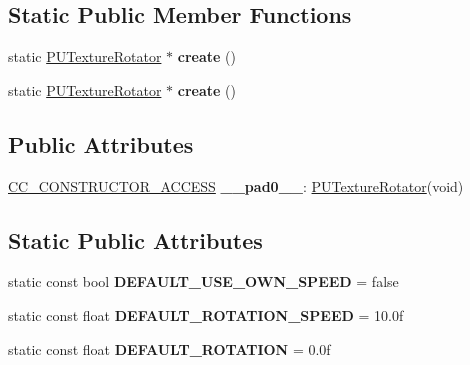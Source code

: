 \subsection*{Static Public Member Functions}
\begin{DoxyCompactItemize}
\item 
\mbox{\label{classPUTextureRotator_aa7c765264b4e5bd6c224a70b5547a8b6}} 
static \hyperlink{classPUTextureRotator}{P\+U\+Texture\+Rotator} $\ast$ {\bfseries create} ()
\item 
\mbox{\label{classPUTextureRotator_ada155edce06056de78acecc9a859ae44}} 
static \hyperlink{classPUTextureRotator}{P\+U\+Texture\+Rotator} $\ast$ {\bfseries create} ()
\end{DoxyCompactItemize}
\subsection*{Public Attributes}
\begin{DoxyCompactItemize}
\item 
\mbox{\label{classPUTextureRotator_ae47bc3cca6bf9f3a0f62361f456b5b0a}} 
\hyperlink{_2cocos2d_2cocos_2base_2ccConfig_8h_a25ef1314f97c35a2ed3d029b0ead6da0}{C\+C\+\_\+\+C\+O\+N\+S\+T\+R\+U\+C\+T\+O\+R\+\_\+\+A\+C\+C\+E\+SS} {\bfseries \+\_\+\+\_\+pad0\+\_\+\+\_\+}\+: \hyperlink{classPUTextureRotator}{P\+U\+Texture\+Rotator}(void)
\end{DoxyCompactItemize}
\subsection*{Static Public Attributes}
\begin{DoxyCompactItemize}
\item 
\mbox{\label{classPUTextureRotator_a14b0f1b440411d2a7e967dde8fd5b62e}} 
static const bool {\bfseries D\+E\+F\+A\+U\+L\+T\+\_\+\+U\+S\+E\+\_\+\+O\+W\+N\+\_\+\+S\+P\+E\+ED} = false
\item 
\mbox{\label{classPUTextureRotator_abfbdb5bd800e03289be29e4902ea50e6}} 
static const float {\bfseries D\+E\+F\+A\+U\+L\+T\+\_\+\+R\+O\+T\+A\+T\+I\+O\+N\+\_\+\+S\+P\+E\+ED} = 10.\+0f
\item 
\mbox{\label{classPUTextureRotator_a88a3bc0de088dae3a8b8064303e418da}} 
static const float {\bfseries D\+E\+F\+A\+U\+L\+T\+\_\+\+R\+O\+T\+A\+T\+I\+ON} = 0.\+0f
\end{DoxyCompactItemize}

